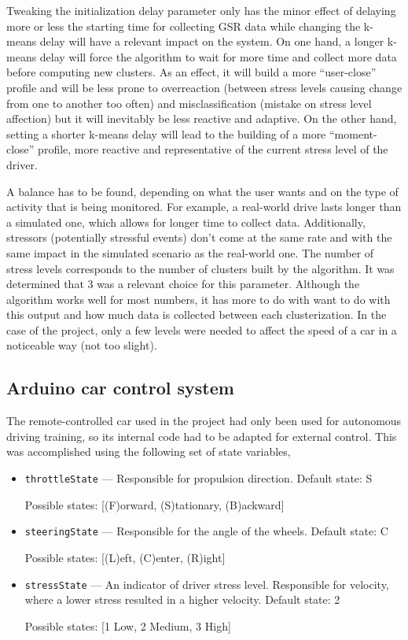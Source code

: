 Tweaking the initialization delay parameter only has the minor effect
of delaying more or less the starting time for collecting GSR data while
changing the k-means delay will have a relevant impact on the system. On one
hand, a longer k-means delay will force the algorithm to wait for more time
and collect more data before computing new clusters. As an effect, it will
build a more ``user-close'' profile and will be less prone to overreaction
(between stress levels causing change from one to another too often) and
misclassification (mistake on stress level affection) but it will inevitably
be less reactive and adaptive. On the other hand, setting a shorter k-means
delay will lead to the building of a more ``moment-close'' profile, more
reactive and representative of the current stress level of the driver.

A balance has to be found, depending on what the user wants and on the type
of activity that is being monitored. For example, a real-world drive lasts
longer than a simulated one, which allows for longer time to collect data.
Additionally, stressors (potentially stressful events) don't come at the same
rate and with the same impact in the simulated scenario as the real-world
one. The number of stress levels corresponds to the number of clusters built
by the algorithm. It was determined that 3 was a relevant choice for this
parameter. Although the algorithm works well for most numbers, it has
more to do with want to do with this output and how much data is collected
between each clusterization. In the case of the project, only a few levels
were needed to affect the speed of a car in a noticeable way (not too slight).

\subsection{Arduino car control system}\label{sec:design_arduino}

The remote-controlled car used in the project had only been used for autonomous
driving training, so its internal code had to be adapted for external
control. This was accomplished using the following set of state variables,

\begin{itemize}
  \item \texttt{throttleState} --- Responsible for propulsion
    direction. Default state: S
    
    Possible states: [(F)orward, (S)tationary, (B)ackward]
  \item \texttt{steeringState} --- Responsible for the angle of the
    wheels. Default state: C
    
    Possible states: [(L)eft, (C)enter, (R)ight]
  \item \texttt{stressState} --- An indicator of driver stress
  level. Responsible for velocity, where a lower stress resulted in a higher
  velocity. Default state: 2
    
    Possible states: [1 Low, 2 Medium, 3 High]
\end{itemize}

